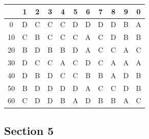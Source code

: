 \documentclass[11pt,a4paper]{article}
\begin{document}
\begin{tabular}{ | c | c c c c c c c c c c | }
\hline
 & 1 & 2 & 3 & 4 & 5 & 6 & 7 & 8 & 9 & 0 \\
\hline
0 & D & C & C & C & D & D & D & D & B & A \\
10 & C & B & C & C & C & A & C & D & B & B \\
20 & B & D & B & B & D & A & C & C & A & C \\
30 & D & C & C & A & C & D & C & A & A & A \\
40 & D & B & D & C & C & B & B & A & D & B \\
50 & B & D & D & D & D & A & C & C & D & B \\
60 & C & D & D & B & A & D & B & B & A & C \\
\hline
\end{tabular}
\clearpage
\subsection*{Section 5}
\end{document}
